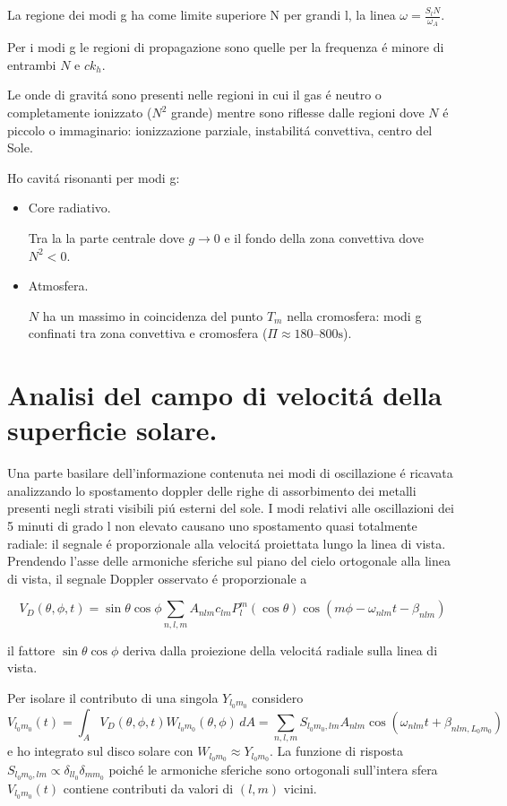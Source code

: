 \documentclass[oneside,12pt]{memoir}
\begin{document}
La regione dei modi g ha come limite superiore N per grandi l, la linea $\omega=\frac{S_lN}{\omega_A}$.

Per i modi g le regioni di propagazione sono quelle per la frequenza \'e minore di entrambi $N$ e $ck_h$.

Le onde di gravit\'a sono presenti nelle regioni in cui il gas \'e neutro o completamente ionizzato ($N^2$ grande) mentre sono riflesse dalle regioni dove $N$ \'e piccolo o immaginario: ionizzazione parziale, instabilit\'a convettiva, centro del Sole.

Ho cavit\'a risonanti per modi g:
\begin{itemize}
    \item Core radiativo.
    
    Tra la la parte centrale dove $g\to0$ e il fondo della zona convettiva dove $N^2<0$.
    \item Atmosfera.
    
    $N$ ha un massimo in coincidenza del punto $T_m$ nella cromosfera: modi g confinati tra zona convettiva e cromosfera ($\Pi\approx\numrange{180}{800}\si{\second}$).
\end{itemize}

\section{Analisi del campo di velocit\'a della superficie solare.}

Una parte basilare dell'informazione contenuta nei modi di oscillazione \'e ricavata analizzando  lo spostamento doppler delle righe di assorbimento dei metalli presenti negli strati visibili pi\'u esterni del sole.
I modi relativi alle oscillazioni dei 5 minuti di grado l non elevato causano uno spostamento quasi totalmente radiale: il segnale \'e proporzionale alla velocit\'a proiettata lungo la linea di vista. Prendendo l'asse delle armoniche sferiche sul piano del cielo ortogonale alla linea di vista, il segnale Doppler osservato \'e proporzionale a

\begin{equation}
    V_D(\theta,\phi,t)=\sin{\theta}\cos{\phi}\sum_{n,l,m}A_{nlm}c_{lm}P_l^m(\cos{\theta})\cos{(m\phi-\omega_{nlm}t-\beta_{nlm})}
\end{equation}

il fattore $\sin{\theta}\cos{\phi}$ deriva dalla proiezione della velocit\'a radiale sulla linea di vista.

Per isolare il contributo di una singola $Y_{l_0m_0}$ considero
\begin{equation}
V_{l_0m_0}(t)=\int_AV_D(\theta,\phi,t)W_{l_0m_0}(\theta,\phi)\,dA=\sum_{n,l,m}S_{l_0m_0,lm}A_{nlm}\cos{(\omega_{nlm}t+\beta_{nlm,L_0m_0})}
\end{equation}
e ho integrato sul disco solare con $W_{l_0m_0}\approx Y_{l_0m_0}$. La funzione di risposta $S_{l_0m_0,lm}\propto\delta_{ll_0}\delta_{mm_0}$ poich\'e le armoniche sferiche sono ortogonali sull'intera sfera $V_{l_0m_0}(t)$ contiene contributi da valori di $(l,m)$ vicini.
\end{document}
